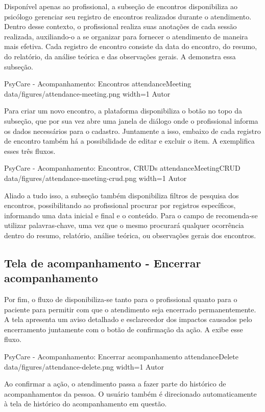 Disponível apenas ao profissional, a subseção de encontros disponibiliza ao psicólogo gerenciar seu registro de encontros realizados durante o atendimento. Dentro desse contexto, o profissional realiza suas anotações de cada sessão realizada, auxiliando-o a se organizar para fornecer o atendimento de maneira mais efetiva. Cada registro de encontro consiste da data do encontro, do resumo, do relatório, da análise teórica e das observações gerais. A  demonstra essa subseção.

\image
    {PsyCare - Acompanhamento: Encontros}
    {attendanceMeeting}
    {data/figures/attendance-meeting.png}
    {width=1\textwidth}
    {Autor}

Para criar um novo encontro, a plataforma disponibiliza o botão  no topo da subseção, que por sua vez abre uma janela de diálogo onde o profissional informa os dados necessários para o cadastro. Juntamente a isso, embaixo de cada registro de encontro também há a possibilidade de editar e excluir o item. A  exemplifica esses três fluxos.

\image
    {PsyCare - Acompanhamento: Encontros, CRUDs}
    {attendanceMeetingCRUD}
    {data/figures/attendance-meeting-crud.png}
    {width=1\textwidth}
    {Autor}

Aliado a tudo isso, a subseção também disponibiliza filtros de pesquisa dos encontros, possibilitando ao profissional procurar por registros específicos, informando uma data inicial e final e o conteúdo. Para o campo de  recomenda-se utilizar palavras-chave, uma vez que o mesmo procurará qualquer ocorrência dentro do resumo, relatório, análise teórica, ou observações gerais dos encontros.

\subsection{Tela de acompanhamento - Encerrar acompanhamento}
\label{sec:acompanhamentoEncerrar}

Por fim, o fluxo de  disponibiliza-se tanto para o profissional quanto para o paciente para permitir com que o atendimento seja encerrado permanentemente. A tela apresenta um aviso detalhado e esclarecedor dos impactos causados pelo encerramento juntamente com o botão de confirmação da ação. A  exibe esse fluxo.

\image
    {PsyCare - Acompanhamento: Encerrar acompanhamento}
    {attendanceDelete}
    {data/figures/attendance-delete.png}
    {width=1\textwidth}
    {Autor}

Ao confirmar a ação, o atendimento passa a fazer parte do histórico de acompanhamentos da pessoa. O usuário também é direcionado automaticamente à tela de histórico do acompanhamento em questão.